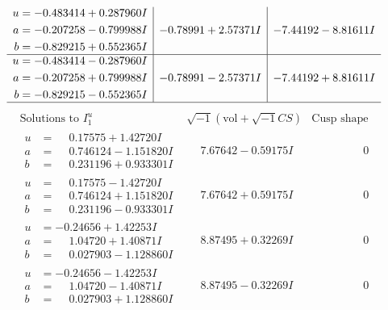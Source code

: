 \documentclass[1p]{elsarticle_modified}
\theoremstyle{definition}
\newcommand{\I}{\sqrt{-1}}
\begin{document}
$$\begin{array}{c|c|c}
\begin{aligned}
u &= -0.483414 + 0.287960 I \\
a &= -0.207258 - 0.799988 I \\
b &= -0.829215 + 0.552365 I\end{aligned}
 & -0.78991 + 2.57371 I & -7.44192 - 8.81611 I \\ \hline\begin{aligned}
u &= -0.483414 - 0.287960 I \\
a &= -0.207258 + 0.799988 I \\
b &= -0.829215 - 0.552365 I\end{aligned}
 & -0.78991 - 2.57371 I & -7.44192 + 8.81611 I\\
 \hline 
 \end{array}$$\newpage$$\begin{array}{c|c|c}  
\text{Solutions to }I^u_{1}& \I (\text{vol} + \sqrt{-1}CS) & \text{Cusp shape}\\
 \hline 
\begin{aligned}
u &= \phantom{-}0.17575 + 1.42720 I \\
a &= \phantom{-}0.746124 - 1.151820 I \\
b &= \phantom{-}0.231196 + 0.933301 I\end{aligned}
 & \phantom{-}7.67642 - 0.59175 I & \phantom{-0.000000 } 0 \\ \hline\begin{aligned}
u &= \phantom{-}0.17575 - 1.42720 I \\
a &= \phantom{-}0.746124 + 1.151820 I \\
b &= \phantom{-}0.231196 - 0.933301 I\end{aligned}
 & \phantom{-}7.67642 + 0.59175 I & \phantom{-0.000000 } 0 \\ \hline\begin{aligned}
u &= -0.24656 + 1.42253 I \\
a &= \phantom{-}1.04720 + 1.40871 I \\
b &= \phantom{-}0.027903 - 1.128860 I\end{aligned}
 & \phantom{-}8.87495 + 0.32269 I & \phantom{-0.000000 } 0 \\ \hline\begin{aligned}
u &= -0.24656 - 1.42253 I \\
a &= \phantom{-}1.04720 - 1.40871 I \\
b &= \phantom{-}0.027903 + 1.128860 I\end{aligned}
 & \phantom{-}8.87495 - 0.32269 I & \phantom{-0.000000 } 0 \\ \hline\begin{aligned}

\end{aligned}
\end{array}$$
\end{document}
